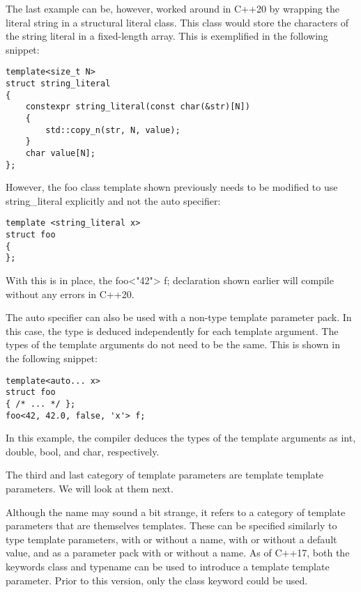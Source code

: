 The last example can be, however, worked around in C++20 by wrapping the literal string in a structural literal class. This class would store the characters of the string literal in a fixed-length array. This is exemplified in the following snippet:

\begin{lstlisting}[style=styleCXX]
template<size_t N>
struct string_literal
{
	constexpr string_literal(const char(&str)[N])
	{
		std::copy_n(str, N, value);
	}
	char value[N];
};
\end{lstlisting}

However, the foo class template shown previously needs to be modified to use string\_literal explicitly and not the auto specifier:

\begin{lstlisting}[style=styleCXX]
template <string_literal x>
struct foo
{
};
\end{lstlisting}

With this is in place, the foo<"42"> f; declaration shown earlier will compile without any errors in C++20.

The auto specifier can also be used with a non-type template parameter pack. In this case, the type is deduced independently for each template argument. The types of the template arguments do not need to be the same. This is shown in the following snippet:

\begin{lstlisting}[style=styleCXX]
template<auto... x>
struct foo
{ /* ... */ };
foo<42, 42.0, false, 'x'> f;
\end{lstlisting}

In this example, the compiler deduces the types of the template arguments as int, double, bool, and char, respectively.

The third and last category of template parameters are template template parameters. We will look at them next.


Although the name may sound a bit strange, it refers to a category of template parameters that are themselves templates. These can be specified similarly to type template parameters, with or without a name, with or without a default value, and as a parameter pack with or without a name. As of C++17, both the keywords class and typename can be used to introduce a template template parameter. Prior to this version, only the class keyword could be used.

